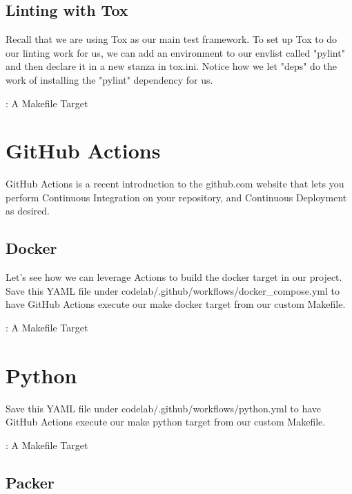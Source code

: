 \subsection{Linting with Tox}

Recall that we are using Tox as our main test framework. To set up Tox
to do our linting work for us, we can add an environment to our envlist
called "pylint" and then declare it in a new stanza in tox.ini. Notice
how we let "deps" do the work of installing the "pylint" dependency for
us.

\begin{mybox}{\thetcbcounter: A Makefile Target}
	
\end{mybox}

\section{GitHub Actions}

\justify
GitHub Actions is a recent introduction to the github.com website that
lets you perform Continuous Integration on your repository, and Continuous Deployment as desired.

\subsection{Docker}

Let's see how we can leverage Actions to build the docker target in our
project. Save this YAML file under
codelab/.github/workflows/docker\_compose.yml to have GitHub Actions
execute our make docker target from our custom Makefile.

\begin{mybox}{\thetcbcounter: A Makefile Target}
	
\end{mybox}


\section{Python}

Save this YAML file under codelab/.github/workflows/python.yml to have
GitHub Actions execute our make python target from our custom Makefile.

\begin{mybox}{\thetcbcounter: A Makefile Target}
	
\end{mybox}

\subsection{Packer}

